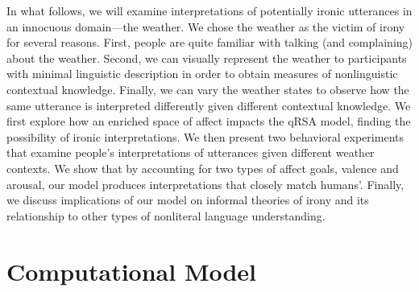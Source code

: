 \documentclass[10pt,letterpaper]{article}
\begin{document}




In what follows, we will examine interpretations of potentially ironic utterances in an innocuous domain---the weather. We chose the weather as the victim of irony for several reasons. First, people are quite familiar with talking (and complaining) about the weather. Second, we can visually represent the weather to participants with minimal linguistic description in order to obtain measures of nonlinguistic contextual knowledge. Finally, we can vary the weather states to observe how the same utterance is interpreted differently given different contextual knowledge. We first explore how an enriched space of affect impacts the qRSA model, finding the possibility of ironic interpretations. We then present two behavioral experiments that examine people's interpretations of utterances given different weather contexts. We show that by accounting for two types of affect goals, valence and arousal, our model produces interpretations that closely match humans'. Finally, we discuss implications of our model on informal theories of irony and its relationship to other types of nonliteral language understanding.

\section{Computational Model}
\end{document}
